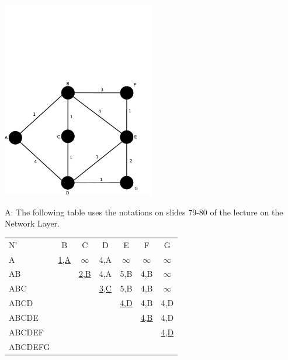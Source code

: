 \documentclass{llncs}
\newcommand{\answer}[1]{
\noindent\color{red}A: #1\color{black}}
\begin{document}
\includegraphics[width=0.5\textwidth]{graph.pdf}

\answer{
  The following table uses the notations on slides 79-80 of the lecture on the Network Layer.\\
  \begin{tabular}{lcccccc}
    N'     & B   & C        & D   & E        & F        & G\\
    A      & \underline{1,A} & $\infty$ & 4,A & $\infty$ & $\infty$ & $\infty$ \\
    AB     &     & \underline{2,B}      & 4,A & 5,B      & 4,B      & $\infty$ \\
    ABC    &     &          & \underline{3,C} & 5,B      & 4,B      & $\infty$ \\
    ABCD   &     &          &     & \underline{4,D}      & 4,B      & 4,D \\
    ABCDE  &     &          &     &          & \underline{4,B}      & 4,D      \\
    ABCDEF &     &          &     &          &          & \underline{4,D}      \\
    ABCDEFG&     &          &     &          &          &          \\
  \end{tabular}
}
\end{document}
